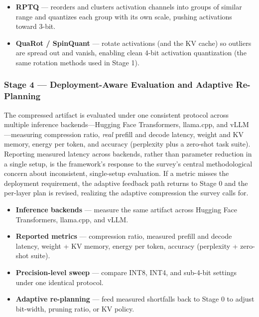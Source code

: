 \documentclass[
11pt, %
english, %
singlespacing, %
headsepline, %
]{MastersDoctoralThesis} %
\begin{document}
\begin{itemize}

  \item \textbf{RPTQ} \cite{yuan2023rptq} --- reorders and clusters activation channels into groups of similar range and quantizes each group with its own scale, pushing activations toward 3-bit.

  \item \textbf{QuaRot / SpinQuant} \cite{ashkboos2024quarot,liu2025spinquant} --- rotate activations (and the KV cache) so outliers are spread out and vanish, enabling clean 4-bit activation quantization (the same rotation methods used in Stage 1).

\end{itemize}

\subsubsection{Stage 4 --- Deployment-Aware Evaluation and Adaptive Re-Planning}

The compressed artifact is evaluated under one consistent protocol across multiple inference backends---Hugging Face Transformers, llama.cpp, and vLLM---measuring compression ratio, \emph{real} prefill and decode latency, weight and KV memory, energy per token, and accuracy (perplexity plus a zero-shot task suite). Reporting measured latency across backends, rather than parameter reduction in a single setup, is the framework's response to the survey's central methodological concern about inconsistent, single-setup evaluation. If a metric misses the deployment requirement, the adaptive feedback path returns to Stage 0 and the per-layer plan is revised, realizing the adaptive compression the survey calls for.

\begin{itemize}

  \item \textbf{Inference backends} --- measure the same artifact across Hugging Face Transformers, llama.cpp, and vLLM.

  \item \textbf{Reported metrics} --- compression ratio, measured prefill and decode latency, weight + KV memory, energy per token, accuracy (perplexity + zero-shot suite).

  \item \textbf{Precision-level sweep} --- compare INT8, INT4, and sub-4-bit settings under one identical protocol.

  \item \textbf{Adaptive re-planning} --- feed measured shortfalls back to Stage 0 to adjust bit-width, pruning ratio, or KV policy.

\end{itemize}
\end{document}
